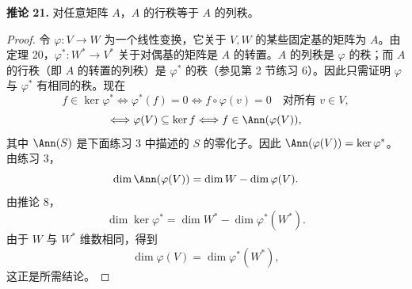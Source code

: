 \noindent\textbf{推论 21.} 对任意矩阵 $A$，$A$ 的行秩等于 $A$ 的列秩。

\begin{proof}
令 $\varphi:V\to W$ 为一个线性变换，它关于 $V,W$ 的某些固定基的矩阵为 $A$。由定理 20，$\varphi^*:W^*\to V^*$ 关于对偶基的矩阵是 $A$ 的转置。$A$ 的列秩是 $\varphi$ 的秩；而 $A$ 的行秩（即 $A$ 的转置的列秩）是 $\varphi^*$ 的秩（参见第 2 节练习 6）。因此只需证明 $\varphi$ 与 $\varphi^*$ 有相同的秩。现在
\[
f\in\ker\varphi^*
\Longleftrightarrow
\varphi^*(f)=0
\Longleftrightarrow
f\circ\varphi(v)=0\quad\text{对所有 }v\in V,
\]
\[
\Longleftrightarrow
\varphi(V)\subseteq\ker f
\Longleftrightarrow
f\in\Ann(\varphi(V)),
\]
其中 $\Ann(S)$ 是下面练习 3 中描述的 $S$ 的零化子。因此 $\Ann(\varphi(V))=\ker\varphi^*$。由练习 3，
\[
\dim\Ann(\varphi(V))=\dim W-\dim\varphi(V).
\]
由推论 8，
\[
\dim\ker\varphi^*=\dim W^*-\dim\varphi^*(W^*).
\]
由于 $W$ 与 $W^*$ 维数相同，得到
\[
\dim\varphi(V)=\dim\varphi^*(W^*),
\]
这正是所需结论。
\end{proof}

